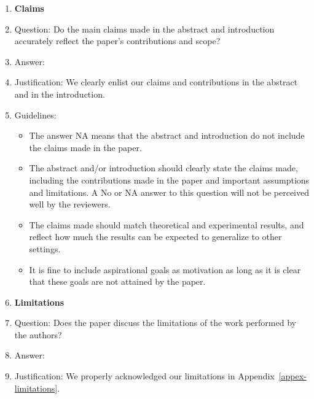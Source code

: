 \documentclass{article}
\theoremstyle{plain}
\theoremstyle{definition}
\theoremstyle{remark}
\begin{document}
\begin{enumerate}

\item {\bf Claims}
    \item[] Question: Do the main claims made in the abstract and introduction accurately reflect the paper's contributions and scope?
    \item[] Answer: \answerYes{} %
    \item[] Justification: We clearly enlist our claims and contributions in the abstract and in the introduction.
    \item[] Guidelines:
    \begin{itemize}
        \item The answer NA means that the abstract and introduction do not include the claims made in the paper.
        \item The abstract and/or introduction should clearly state the claims made, including the contributions made in the paper and important assumptions and limitations. A No or NA answer to this question will not be perceived well by the reviewers. 
        \item The claims made should match theoretical and experimental results, and reflect how much the results can be expected to generalize to other settings. 
        \item It is fine to include aspirational goals as motivation as long as it is clear that these goals are not attained by the paper. 
    \end{itemize}

\item {\bf Limitations}
    \item[] Question: Does the paper discuss the limitations of the work performed by the authors?
    \item[] Answer: \answerYes{} %
    \item[] Justification: We properly acknowledged our limitations in Appendix~\ref{appex-limitations}.
    

\end{enumerate}
\end{document}
